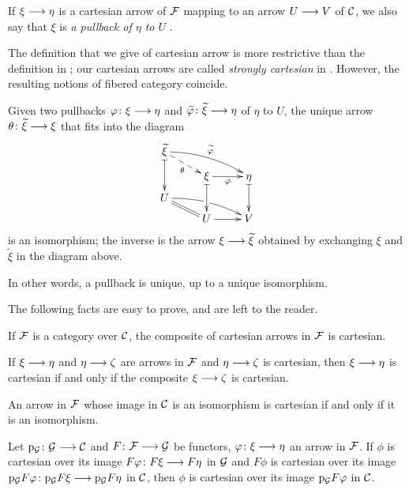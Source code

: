 \begin{3   FIBERED CATEGORIES}
\begin{3.1 Fibered categories}
\begin{definition}
If $\xi \arr \eta$ is a cartesian arrow of $\mathcal{F}$ mapping to an arrow $U \arr V$ of $\mathcal{C}$, we also say that $\xi$ is \emph{a pullback of $\eta$ to $U$}%
.
\end{definition}

\begin{remark}\label{rmk:unique-pullback}
The definition that we give of cartesian arrow is more restrictive than the definition in \cite{sga1};  our cartesian arrows are called \emph{strongly cartesian} in \cite{gray-fibered}. However, the resulting notions of fibered category coincide.
\end{remark}


\begin{remark}
Given two pullbacks $\phi\colon \xi \arr \eta$ and $\widetilde\phi \colon \widetilde\xi \arr \eta $ of $\eta$ to $U$, the unique arrow $\theta\colon \widetilde \xi \arr \xi$ that fits into the diagram
   \[
   \xymatrix@R=6pt{
   {\widetilde\xi}\ar@{|->}[dd]\ar@{-->}[rd]_\theta
   \ar@/^/[rrd]^{\widetilde\phi} \\
   & {}\xi\ar@{|->}[dd]\ar[r]_{\phi}
   &{}\eta\ar@{|->}[dd] \\
   U\ar@{=}[rd]\ar@/^/[rrd]|(.482)\hole\\
   & U \ar[r] & V
   }
   \]
is an isomorphism; the inverse is the arrow $\xi \arr \widetilde{\xi}$ obtained by exchanging $\xi$ and $\widetilde{\xi}$ in the diagram above.

In other words, a pullback is unique, up to a unique isomorphism.
\end{remark}

The following facts are easy to prove, and are left to the reader.

\begin{proposition}
\hfil
\begin{enumeratei}

 If $\mathcal{F}$ is a category over $\mathcal{C}$, the composite of cartesian arrows in $\mathcal{F}$ is cartesian.

 If $\xi \arr \eta$ and $\eta \arr \zeta$ are arrows in $\mathcal{F}$ and $\eta \arr\zeta$ is cartesian, then $\xi \arr\eta$ is cartesian if and only if the composite $\xi \arr \zeta$ is cartesian.

 An arrow in $\mathcal{F}$ whose image in $\mathcal{C}$ is an isomorphism is cartesian if and only if it is an isomorphism.

 Let $\p_{\cG}\colon \cG \arr \cC$ and $F \colon \cF \arr \cG$ be functors, $\phi \colon \xi \arr \eta$ an arrow in $\mathcal{F}$. If $\phi$ is cartesian over its image $F \phi \colon F \xi \arr F \eta$ in $\mathcal{G}$ and $F \phi$ is cartesian over its image $\p_{\cG}F\phi \colon \p_{\cG}F\xi \arr \p_{\cG}F \eta$ in $\mathcal{C}$, then $\phi$ is cartesian over its image $\mathrm{p}_{\mathcal{G}}F\varphi$ in $\mathcal{C}$.
\end{enumeratei}
\end{proposition}


\end{3.1 Fibered categories}
\end{3   FIBERED CATEGORIES}
